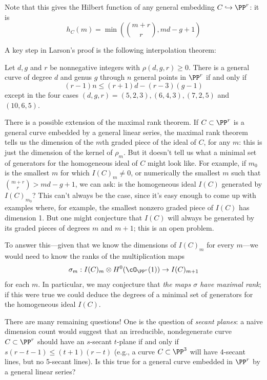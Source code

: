 Note that this gives
 the Hilbert function of any general embedding $C \hookrightarrow \PP^r$: it is 
 $$
 h_C(m) = \min(\binom{m+r}{r} , md-g+1)
 $$
 


A key step in Larson's proof is the following interpolation theorem:

\begin{theorem}\label{Larson-Vogt}
Let $d, g$ and $r$
be nonnegative integers with $\rho(d, g, r) \geq 0$. There is a general curve of degree $d$ and genus $g$ through $n$ general
points in $\PP^r$
if and only if
$$
(r-1)n \leq (r + 1)d-(r-3)(g-1)
$$
except in the four cases $(d, g, r) = (5, 2, 3),(6, 4, 3),(7, 2, 5)$ and $(10, 6, 5)$.

 \end{theorem}
 
There is a possible extension of the maximal rank theorem. If $C \subset \PP^r$ is a general curve embedded by a general linear series, the maximal rank theorem tells us the dimension of the $m$th graded piece of the ideal of $C$, for any $m$: this is just the dimension of the kernel of $\rho_m$. But it doesn't tell us what a minimal set of generators for the homogeneous ideal of $C$ might look like. For example, if $m_0$ is the smallest $m$ for which $I(C)_m \neq 0$, or numerically the smallest $m$ such that $\binom{m+r}{r} > md-g+1$, we can ask: is the homogeneous ideal $I(C)$ generated by $I(C)_{m_0}$? This can't always be the case, since it's easy enough to come up with examples where, for example, the  smallest nonzero graded piece of $I(C)$ has dimension 1. But one might conjecture that $I(C)$ will always be generated by its graded pieces of degrees $m$ and $m+1$; this is an open problem.

To answer this---given that we know the dimensions of $I(C)_m$ for every $m$---we would need to know the ranks of the multiplication maps
$$
\sigma_m : I(C)_m \otimes H^0(\cO_{\PP^r}(1)) \to I(C)_{m+1}
$$
for each $m$. In particular, we may conjecture that \emph{the maps $\sigma$ have maximal rank}; if this were true we could deduce the degrees of a minimal set of generators for the homogeneous ideal $I(C)$.


There are many remaining questions! One is the question of \emph{secant planes}: a naive dimension count would suggest that an irreducible, nondegenerate curve $C \subset \PP^r$ should have an $s$-secant $t$-plane if and only if $s(r-t-1) \leq (t+1)(r-t)$
(e.g., a curve $C \subset \PP^3$ will have 4-secant lines, but no 5-secant lines). Is this true for a general curve embedded in $\PP^r$ by a general linear series?



